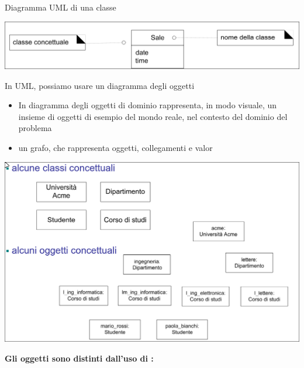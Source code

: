 \documentclass{article}
\begin{document}
Diagramma UML di una classe
\begin{center}
    \includegraphics[width=\textwidth]{images/uml class.png}
\end{center}
In UML, possiamo usare un diagramma degli oggetti
\begin{itemize}
    \item In diagramma degli oggetti di dominio rappresenta, in modo visuale, un insieme di oggetti di esempio del mondo reale, nel contesto del dominio del problema
    \item \Eaccentata un grafo, che rappresenta oggetti, collegamenti e valor
\end{itemize}
\begin{center}
    \includegraphics[width=\textwidth]{images/classi e oggetti concettuali.png}
\end{center}
\Large\textbf{Gli oggetti sono distinti dall'uso di :}\normalsize
\end{document}
